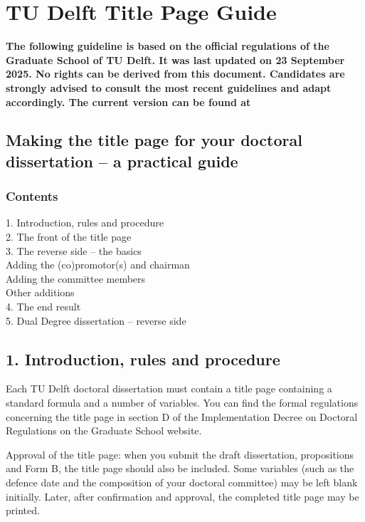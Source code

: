\chapter{TU Delft Title Page Guide}
\textbf{The following guideline is based on the official regulations of the Graduate School of TU Delft. It was last updated on 23 September 2025. No rights can be derived from this document. Candidates are strongly advised to consult the most recent guidelines and adapt accordingly. The current version can be found at} %
\section*{Making the title page for your doctoral dissertation – a practical guide}

\subsection*{Contents}
1. Introduction, rules and procedure \\
2. The front of the title page \\
3. The reverse side – the basics \\
 Adding the (co)promotor(s) and chairman \\
 Adding the committee members \\
 Other additions \\
4. The end result \\
5. Dual Degree dissertation – reverse side

\section*{1. Introduction, rules and procedure}
Each TU Delft doctoral dissertation must contain a title page containing a standard formula and a number of variables.  
You can find the formal regulations concerning the title page in section D of the Implementation Decree on Doctoral Regulations on the Graduate School website.  

Approval of the title page: when you submit the draft dissertation, propositions and Form B, the title page should also be included. Some variables (such as the defence date and the composition of your doctoral committee) may be left blank initially. Later, after confirmation and approval, the completed title page may be printed.

